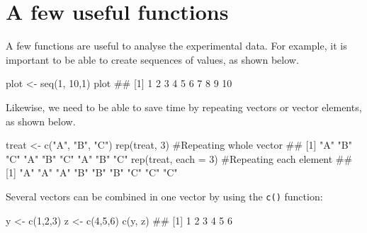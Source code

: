 \documentclass[a4paper,12pt,oneside]{book}
\newenvironment{Shaded}{\begin{snugshade}}{\end{snugshade}}
\newcommand{\DecValTok}[1]{#1}
\newcommand{\StringTok}[1]{#1}
\newcommand{\CommentTok}[1]{#1}
\newcommand{\DocumentationTok}[1]{#1}
\newcommand{\OtherTok}[1]{#1}
\newcommand{\FunctionTok}[1]{#1}
\newcommand{\AttributeTok}[1]{#1}
\newcommand{\NormalTok}[1]{#1}
\begin{document}
\hypertarget{a-few-useful-functions}{%
\section{A few useful functions}\label{a-few-useful-functions}}

A few functions are useful to analyse the experimental data. For example, it is important to be able to create sequences of values, as shown below.

\begin{Shaded}
\begin{Highlighting}[]
\NormalTok{plot  }\OtherTok{\textless{}{-}}  \FunctionTok{seq}\NormalTok{(}\DecValTok{1}\NormalTok{, }\DecValTok{10}\NormalTok{,}\DecValTok{1}\NormalTok{)}
\NormalTok{plot}
\DocumentationTok{\#\#  [1]  1  2  3  4  5  6  7  8  9 10}
\end{Highlighting}
\end{Shaded}

Likewise, we need to be able to save time by repeating vectors or vector elements, as shown below.

\begin{Shaded}
\begin{Highlighting}[]
\NormalTok{treat }\OtherTok{\textless{}{-}} \FunctionTok{c}\NormalTok{(}\StringTok{"A"}\NormalTok{, }\StringTok{"B"}\NormalTok{, }\StringTok{"C"}\NormalTok{)}
\FunctionTok{rep}\NormalTok{(treat, }\DecValTok{3}\NormalTok{) }\CommentTok{\#Repeating whole vector}
\DocumentationTok{\#\# [1] "A" "B" "C" "A" "B" "C" "A" "B" "C"}
\FunctionTok{rep}\NormalTok{(treat, }\AttributeTok{each =} \DecValTok{3}\NormalTok{) }\CommentTok{\#Repeating each element}
\DocumentationTok{\#\# [1] "A" "A" "A" "B" "B" "B" "C" "C" "C"}
\end{Highlighting}
\end{Shaded}

Several vectors can be combined in one vector by using the \texttt{c()} function:

\begin{Shaded}
\begin{Highlighting}[]
\NormalTok{y }\OtherTok{\textless{}{-}} \FunctionTok{c}\NormalTok{(}\DecValTok{1}\NormalTok{,}\DecValTok{2}\NormalTok{,}\DecValTok{3}\NormalTok{)}
\NormalTok{z }\OtherTok{\textless{}{-}} \FunctionTok{c}\NormalTok{(}\DecValTok{4}\NormalTok{,}\DecValTok{5}\NormalTok{,}\DecValTok{6}\NormalTok{)}
\FunctionTok{c}\NormalTok{(y, z)}
\DocumentationTok{\#\# [1] 1 2 3 4 5 6}
\end{Highlighting}
\end{Shaded}
\end{document}
